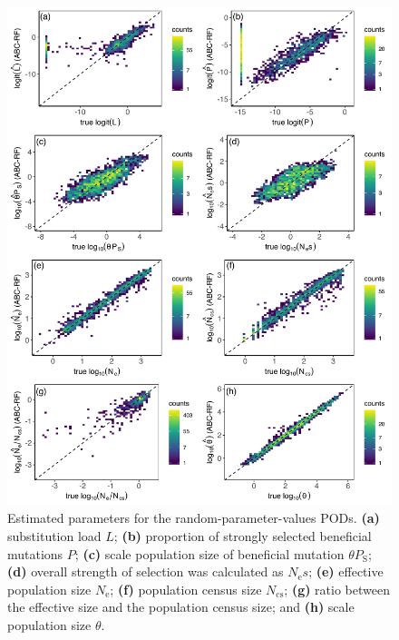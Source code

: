 \documentclass[a4paper, 12pt]{article}
\begin{document}
\begin{figure}[!htb]
  \centering
  \label{fig:fig2}
  \includegraphics[width=1\textwidth]{Figures/pred_plots_ggplot2_mod.pdf}
  \captionsetup{font=footnotesize}
  \caption{Estimated parameters for the random-parameter-values PODs. \textbf{(a)} substitution load $L$; \textbf{(b)} proportion of strongly selected beneficial mutations $P$; \textbf{(c)} scale population size of beneficial mutation $\theta P_{\mathrm{S}}$; \textbf{(d)} overall strength of selection was calculated as $N_{\mathrm{e}}s$; \textbf{(e)} effective population size $N_{\mathrm{e}}$; \textbf{(f)} population census size $N_{\mathrm{cs}}$; \textbf{(g)} ratio between the effective size and the population census size; and \textbf{(h)} scale population size $\theta$.}
\end{figure}
\end{document}
